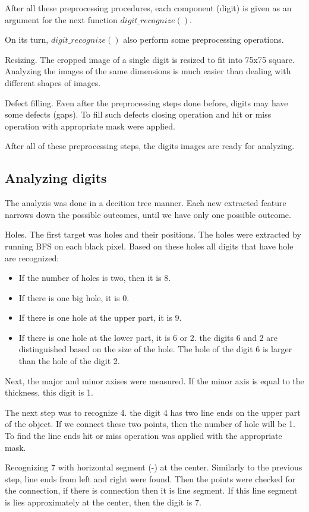 \documentclass[conference]{IEEEtran}
\begin{document}
After all these preprocessing procedures, each component (digit) is given as an argument for the next function $digit\_recognize()$.

On its turn, $digit\_recognize()$ also perform some preprocessing operations.

Resizing. The cropped image of a single digit is resized to fit into 75x75 square. Analyzing the images of the same dimensions is much easier than dealing with different shapes of images.

Defect filling. Even after the preprocessing steps done before, digits may have some defects (gaps). To fill such defects closing operation and hit or miss operation with appropriate mask were applied.

After all of these preprocessing steps, the digits images are ready for analyzing.


\subsection{Analyzing digits}

The analyzis was done in a decition tree manner. Each new extracted feature narrows down the possible outcomes, until we have only one possible outcome.

Holes. The first target was holes and their positions. The holes were extracted by running BFS on each black pixel. Based on these holes all digits that have hole are recognized:
\begin{itemize}
    \item If the number of holes is two, then it is 8.
    \item If there is one big hole, it is 0.
    \item If there is one hole at the upper part, it is 9.
    \item If there is one hole at the lower part, it is 6 or 2. the digits 6 and 2 are distinguished based on the size of the hole. The hole of the digit 6 is larger than the hole of the digit 2.
\end{itemize}

Next, the major and minor axises were measured. If the minor axis is equal to the thickness, this digit is 1.

The next step was to recognize 4. the digit 4 has two line ends on the upper part of the object. If we connect these two points, then the number of hole will be 1. To find the line ends hit or miss operation was applied with the appropriate mask.

Recognizing 7 with horizontal segment (-) at the center. Similarly to the previous step, line ends from left and right were found. Then the points were checked for the connection, if there is connection then it is line segment. If this line segment is lies approximately at the center, then the digit is 7.
\end{document}
